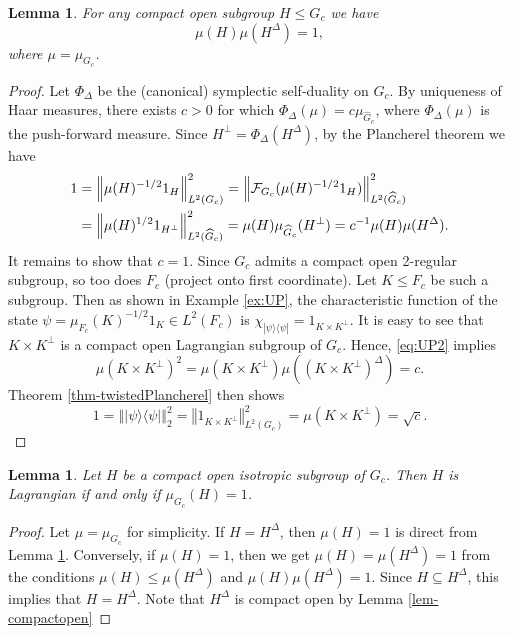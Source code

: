 \documentclass[12pt,reqno]{amsart}
\newtheorem{lem}[thm]{Lemma}
\theoremstyle{definition}
\theoremstyle{definition}
\theoremstyle{definition}
\numberwithin{thm}{section}
\numberwithin{equation}{section}
\newcommand{\norm}[1]{\left\Vert#1\right\Vert}
\newcommand{\la}{\langle}
\newcommand{\ra}{\rangle}
\newcommand{\mc}[1]{\mathcal #1}
\newcommand{\wh}[1]{\widehat{#1}}
\begin{document}
\begin{lem}\label{lem-UP} For any compact open subgroup $H\leq G_c$ we have
\begin{equation}\label{eq:UP}\mu(H)\mu(H^\Delta)=1,\end{equation}
where $\mu = \mu_{G_c}$.
\end{lem}

\begin{proof} Let $\Phi_\Delta$ be the (canonical) symplectic self-duality on $G_c$. By uniqueness of Haar measures, there exists $c>0$ for which $\Phi_\Delta(\mu)=c\mu_{\wh{G}_c}$, where $\Phi_\Delta(\mu)$ is the push-forward measure.
Since $H^\perp=\Phi_\Delta(H^\Delta)$, by the Plancherel theorem we have
\begin{align}
    \label{eq:UP2}1&=\norm{\mu(H)^{-1/2}1_H}_{L^2(G_c)}^2=\norm{\mc{F}_{G_c}(\mu(H)^{-1/2}1_H)}_{L^2(\wh{G}_c)}^2\\
    \notag &=\norm{\mu(H)^{1/2}1_{H^\perp}}_{L^2(\wh{G}_c)}^2=\mu(H)\mu_{\wh{G}_c}(H^\perp)=c^{-1}\mu(H)\mu(H^\Delta).
\end{align}
It remains to show that $c=1$. Since $G_c$ admits a compact open 2-regular subgroup, so too does $F_c$ (project onto first coordinate). Let $K\leq F_c$ be such a subgroup. Then as shown in Example \ref{ex:UP}, the characteristic function of the state $\psi=\mu_{F_c}(K)^{-1/2}1_K\in L^2(F_c)$ is $\chi_{|\psi\ra\la \psi|}=1_{K\times K^\perp}$. It is easy to see that $K\times K^\perp$ is a compact open Lagrangian subgroup of $G_c$. Hence, \eqref{eq:UP2} implies
    $$\mu(K\times K^\perp)^2=\mu(K\times K^\perp)\mu((K\times K^\perp)^\Delta)=c.$$
Theorem \ref{thm-twistedPlancherel} then shows
    \begin{equation}\label{eq-KKperp}
    1=\norm{|\psi\ra\la\psi|}^2_2=\norm{1_{K\times K^\perp}}_{L^2(G_c)}^2=\mu(K\times K^\perp)=\sqrt{c}.    
    \end{equation}
\end{proof}


\begin{lem}\label{lem-Lagrangian}
Let $H$ be a compact open isotropic subgroup of $G_c$. Then $H$ is Lagrangian if and only if $\mu_{G_c}(H)=1$.
\end{lem}

\begin{proof}
Let $\mu = \mu_{G_c}$ for simplicity. If $H=H^\Delta$, then $\mu(H)=1$ is direct from Lemma \ref{lem-UP}. Conversely, if $\mu(H)=1$, then we get $\mu(H)=\mu(H^\Delta)=1$ from the conditions $\mu(H)\leq\mu(H^\Delta)$ and $\mu(H)\mu(H^\Delta) = 1$. Since $H\subseteq H^\Delta$, this implies that $H=H^\Delta$. Note that $H^\Delta$ is compact open by Lemma \ref{lem-compactopen}

\end{proof}
\end{document}
